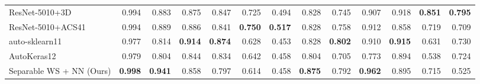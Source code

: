 \begin{table*}[]
\begin{adjustbox}{angle=90}
\begin{tabular}{|l|rr|rr|rr|rr|rr|rr|}
ResNet-5010+3D          & 0.994                   & 0.883                   & 0.875                   & 0.847                   & 0.725                   & 0.494                   & 0.828                   & 0.745                   & 0.907                   & 0.918                   & \textbf{0.851}          & \textbf{0.795}          \\
ResNet-5010+ACS41       & 0.994                   & 0.889                   & 0.886                   & 0.841                   & \textbf{0.750}           & \textbf{0.517}          & 0.828                   & 0.758                   & 0.912                   & 0.858                   & 0.719                   & 0.709                   \\
auto-sklearn11          & 0.977                   & 0.814                   & \textbf{0.914}          & \textbf{0.874}          & 0.628                   & 0.453                   & 0.828                   & \textbf{0.802}          & 0.910                   & \textbf{0.915}          & 0.631                   & 0.730                    \\
AutoKeras12             & 0.979                   & 0.804                   & 0.844                   & 0.834                   & 0.642                   & 0.458                   & 0.804                   & 0.705                   & 0.773                   & 0.894                   & 0.538                   & 0.724                   \\ \hline
Separable WS + NN (Ours)  & \textbf{0.998}          & \textbf{0.941}          & 0.858                   & 0.797                   & 0.614                   & 0.458                   & \textbf{0.875}          & 0.792                   & \textbf{0.962}          & 0.895                   & 0.715                   & 0.525    \\ \hline              
\end{tabular}
\end{adjustbox}
\end{table*}

